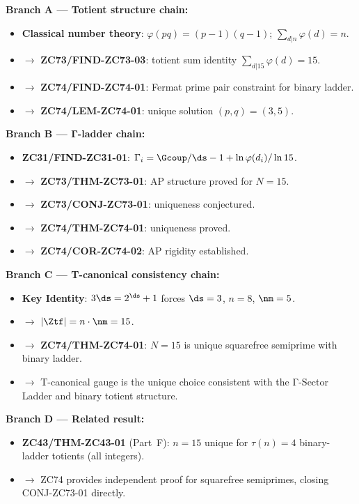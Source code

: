 \documentclass[12pt, a4paper]{article}
\begin{document}
\begin{genealogybox}[title={How ZC74's Key Objects Trace Back}]

\textbf{Branch A --- Totient structure chain:}
\begin{itemize}[leftmargin=2em, noitemsep]
  \item \textbf{Classical number theory}: $\varphi(pq) = (p-1)(q-1)$;
    $\sum_{d|n}\varphi(d) = n$.
  \item $\to$ \textbf{ZC73/FIND-ZC73-03}: totient sum identity
    $\sum_{d|15}\varphi(d) = 15$.
  \item $\to$ \textbf{ZC74/FIND-ZC74-01}: Fermat prime pair constraint
    for binary ladder.
  \item $\to$ \textbf{ZC74/LEM-ZC74-01}: unique solution $(p,q)=(3,5)$.
\end{itemize}

\textbf{Branch B --- Γ-ladder chain:}
\begin{itemize}[leftmargin=2em, noitemsep]
  \item \textbf{ZC31/FIND-ZC31-01}: $\Gamma_i = \Gcoup/\ds - 1
    + \ln\varphi(d_i)/\ln15$.
  \item $\to$ \textbf{ZC73/THM-ZC73-01}: AP structure proved for $N=15$.
  \item $\to$ \textbf{ZC73/CONJ-ZC73-01}: uniqueness conjectured.
  \item $\to$ \textbf{ZC74/THM-ZC74-01}: uniqueness proved.
  \item $\to$ \textbf{ZC74/COR-ZC74-02}: AP rigidity established.
\end{itemize}

\textbf{Branch C --- T-canonical consistency chain:}
\begin{itemize}[leftmargin=2em, noitemsep]
  \item \textbf{Key Identity}: $3\ds = 2^{\ds}+1$ forces $\ds=3$,
    $n=8$, $\nm=5$.
  \item $\to$ $|\Ztf| = n \cdot \nm = 15$.
  \item $\to$ \textbf{ZC74/THM-ZC74-01}: $N=15$ is unique squarefree
    semiprime with binary ladder.
  \item $\to$ T-canonical gauge is the unique choice consistent with
    the Γ-Sector Ladder and binary totient structure.
\end{itemize}

\textbf{Branch D --- Related result:}
\begin{itemize}[leftmargin=2em, noitemsep]
  \item \textbf{ZC43/THM-ZC43-01} (Part~F): $n=15$ unique for
    $\tau(n)=4$ binary-ladder totients (all integers).
  \item $\to$ ZC74 provides independent proof for squarefree semiprimes,
    closing CONJ-ZC73-01 directly.
\end{itemize}


\end{genealogybox}
\end{document}
